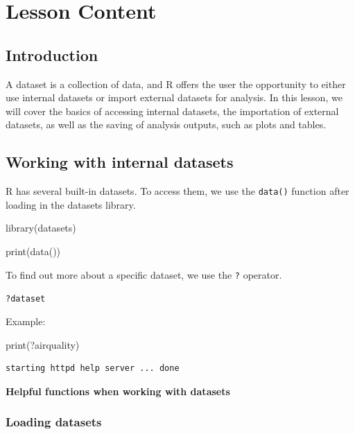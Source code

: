 \documentclass[
  letterpaper,
  DIV=11,
  numbers=noendperiod]{scrreprt}
\newenvironment{Shaded}{\begin{snugshade}}{\end{snugshade}}
\newcommand{\FunctionTok}[1]{\textcolor[rgb]{0.28,0.35,0.67}{#1}}
\newcommand{\NormalTok}[1]{\textcolor[rgb]{0.00,0.23,0.31}{#1}}
\begin{document}
\section{Lesson Content}\label{lesson-content-4}

\subsection{Introduction}\label{introduction-3}

A dataset is a collection of data, and R offers the user the opportunity
to either use internal datasets or import external datasets for
analysis. In this lesson, we will cover the basics of accessing internal
datasets, the importation of external datasets, as well as the saving of
analysis outputs, such as plots and tables.

\subsection{Working with internal
datasets}\label{working-with-internal-datasets}

R has several built-in datasets. To access them, we use the
\texttt{data()} function after loading in the datasets library.

\begin{Shaded}
\begin{Highlighting}[]
\FunctionTok{library}\NormalTok{(datasets)}

\FunctionTok{print}\NormalTok{(}\FunctionTok{data}\NormalTok{())}
\end{Highlighting}
\end{Shaded}

To find out more about a specific dataset, we use the \texttt{?}
operator.

\texttt{?dataset}

Example:

\begin{Shaded}
\begin{Highlighting}[]
\FunctionTok{print}\NormalTok{(?airquality)}
\end{Highlighting}
\end{Shaded}

\begin{verbatim}
starting httpd help server ... done
\end{verbatim}

\textbf{Helpful functions when working with datasets}

\subsubsection{Loading datasets}\label{loading-datasets}
\end{document}
